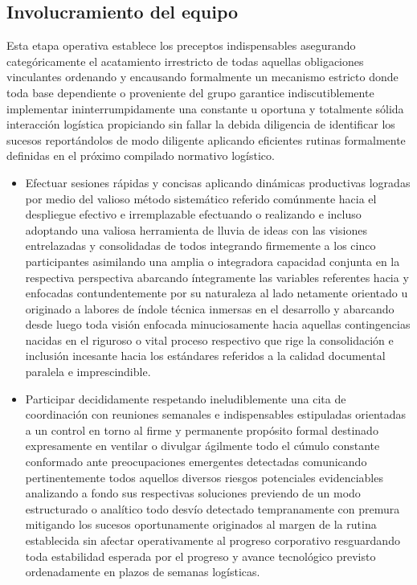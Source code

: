 \documentclass[11pt,spanish]{article}
\begin{document}
\subsection{Involucramiento del equipo}

Esta etapa operativa establece los preceptos indispensables asegurando categóricamente el acatamiento irrestricto de todas aquellas obligaciones vinculantes ordenando y encausando formalmente un mecanismo estricto donde toda base dependiente o proveniente del grupo garantice indiscutiblemente implementar ininterrumpidamente una constante u oportuna y totalmente sólida interacción logística propiciando sin fallar la debida diligencia de identificar los sucesos reportándolos de modo diligente aplicando eficientes rutinas formalmente definidas en el próximo compilado normativo logístico.

\begin{itemize}
    \item Efectuar sesiones rápidas y concisas aplicando dinámicas productivas logradas por medio del valioso método sistemático referido comúnmente hacia el despliegue efectivo e irremplazable efectuando o realizando e incluso adoptando una valiosa herramienta de lluvia de ideas con las visiones entrelazadas y consolidadas de todos integrando firmemente a los cinco participantes asimilando una amplia o integradora capacidad conjunta en la respectiva perspectiva abarcando íntegramente las variables referentes hacia y enfocadas contundentemente por su naturaleza al lado netamente orientado u originado a labores de índole técnica inmersas en el desarrollo y abarcando desde luego toda visión enfocada minuciosamente hacia aquellas contingencias nacidas en el riguroso o vital proceso respectivo que rige la consolidación e inclusión incesante hacia los estándares referidos a la calidad documental paralela e imprescindible.
    \item Participar decididamente respetando ineludiblemente una cita de coordinación con reuniones semanales e indispensables estipuladas orientadas a un control en torno al firme y permanente propósito formal destinado expresamente en ventilar o divulgar ágilmente todo el cúmulo constante conformado ante preocupaciones emergentes detectadas comunicando pertinentemente todos aquellos diversos riesgos potenciales evidenciables analizando a fondo sus respectivas soluciones previendo de un modo estructurado o analítico todo desvío detectado tempranamente con premura mitigando los sucesos oportunamente originados al margen de la rutina establecida sin afectar operativamente al progreso corporativo resguardando toda estabilidad esperada por el progreso y avance tecnológico previsto ordenadamente en plazos de semanas logísticas.
\end{itemize}
\end{document}
